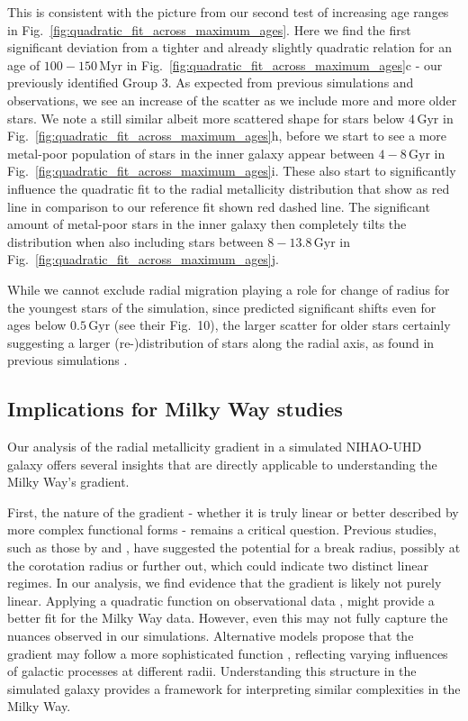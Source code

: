 \documentclass[fleqn,usenatbib]{mnras}
\begin{document}
This is consistent with the picture from our second test of increasing age ranges in Fig.~\ref{fig:quadratic_fit_across_maximum_ages}. Here we find the first significant deviation from a tighter and already slightly quadratic relation for an age of $100-150\,\mathrm{Myr}$ in Fig.~\ref{fig:quadratic_fit_across_maximum_ages}c - our previously identified Group 3. As expected from previous simulations and observations, we see an increase of the scatter as we include more and more older stars. We note a still similar albeit more scattered shape for stars below $4\,\mathrm{Gyr}$ in  Fig.~\ref{fig:quadratic_fit_across_maximum_ages}h, before we start to see a more metal-poor population of stars in the inner galaxy appear between $4-8\,\mathrm{Gyr}$ in  Fig.~\ref{fig:quadratic_fit_across_maximum_ages}i. These also start to significantly influence the quadratic fit to the radial metallicity distribution that show as red line in comparison to our reference fit shown red dashed line. The significant amount of metal-poor stars in the inner galaxy then completely tilts the distribution when also including stars between $8-13.8\,\mathrm{Gyr}$ in Fig.~\ref{fig:quadratic_fit_across_maximum_ages}j.

While we cannot exclude radial migration playing a role for change of radius for the youngest stars of the simulation, since \citet{Frankel2018} predicted significant shifts even for ages below $0.5\,\mathrm{Gyr}$ (see their Fig.~10), the larger scatter for older stars certainly suggesting a larger (re-)distribution of stars along the radial axis, as found in previous simulations \citep{Minchev2010, Grand2015}.

\subsection{Implications for Milky Way studies} \label{sec:implications_milky_way}

Our analysis of the radial metallicity gradient in a simulated NIHAO-UHD galaxy offers several insights that are directly applicable to understanding the Milky Way's gradient.

First, the nature of the gradient - whether it is truly linear or better described by more complex functional forms - remains a critical question. Previous studies, such as those by \citet{Lepine2011} and \citet{Donor2020}, have suggested the potential for a break radius, possibly at the corotation radius or further out, which could indicate two distinct linear regimes. In our analysis, we find evidence that the gradient is likely not purely linear. Applying a quadratic function on observational data \citep{Yong2012, Andrievsky2004, Genovali2014}, might provide a better fit for the Milky Way data. However, even this may not fully capture the nuances observed in our simulations. Alternative models propose that the gradient may follow a more sophisticated function \citep[e.g.][]{Chiappini2001, Kubryk2015}, reflecting varying influences of galactic processes at different radii. Understanding this structure in the simulated galaxy provides a framework for interpreting similar complexities in the Milky Way.
\end{document}
